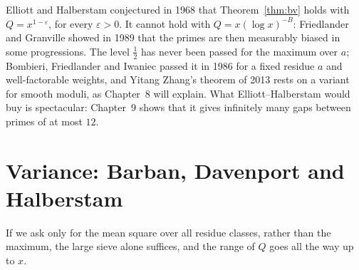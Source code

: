 \begin{remark}
Elliott and Halberstam conjectured in 1968 that Theorem~\ref{thm:bv} holds with $Q=x^{1-\varepsilon}$, for every $\varepsilon>0$. It cannot hold with $Q=x(\log x)^{-B}$: Friedlander and Granville showed in 1989 that the primes are then measurably biased in some progressions. The level $\frac12$ has never been passed for the maximum over $a$; Bombieri, Friedlander and Iwaniec passed it in 1986 for a fixed residue $a$ and well-factorable weights, and Yitang Zhang's theorem of 2013 rests on a variant for smooth moduli, as Chapter~8 will explain. What Elliott--Halberstam would buy is spectacular: Chapter~9 shows that it gives infinitely many gaps between primes of at most $12$.
\end{remark}

\section{Variance: Barban, Davenport and Halberstam}

If we ask only for the mean square over all residue classes, rather than the maximum, the large sieve alone suffices, and the range of $Q$ goes all the way up to $x$.

